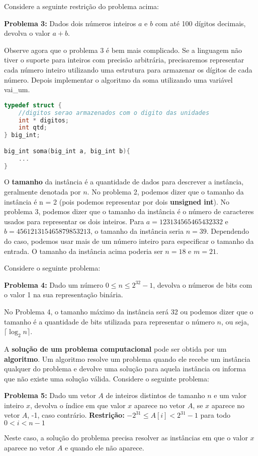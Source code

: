 Considere a seguinte restrição do problema acima:

\textbf{Problema 3:} Dados dois números inteiros $a$ e $b$ com até 100 dígitos decimais, devolva o valor $a + b$. 

Observe agora que o problema 3 é bem mais complicado. Se a linguagem não tiver o suporte para inteiros com precisão arbitrária, precisaremos representar cada número inteiro utilizando uma estrutura para armazenar os dígitos de cada número. Depois implementar o algoritmo da soma utilizando uma variável vai\_um. 

\begin{lstlisting}[language=C, caption={Solução para o problema 3}]
typedef struct {
	//digitos serao armazenados com o digito das unidades
	int * digitos;
	int qtd;
} big_int;

big_int soma(big_int a, big_int b){
	...
}
\end{lstlisting}

O \textbf{tamanho} da instância é a quantidade de dados para descrever a instância, geralmente denotada por $n$. No problema 2, podemos dizer que o tamanho da instância é n = 2 (pois podemos representar por dois \textbf{unsigned int}). No problema 3, podemos dizer que o tamanho da instância é o número de caracteres usados para representar os dois inteiros. Para $a = 123134565465432332$ e $b = 456121315465879853213$, o tamanho da instância seria $n = 39$. Dependendo do caso, podemos usar mais de um número inteiro para especificar o tamanho da entrada. O tamanho da instância acima poderia ser $n = 18$ e $m = 21$. 

Considere o seguinte problema:

\textbf{Problema 4:} Dado um número $ 0 \leq n \leq 2^{32}-1$, devolva o números de bits com o valor 1 na sua representação binária.   

No Problema 4, o tamanho máximo da instância será 32 ou podemos dizer que o tamanho é a quantidade de bits utilizada para representar o número $n$, ou seja, $\lceil \log_2{n} \rceil$.

A \textbf{solução de um problema computacional} pode ser obtida por um \textbf{algoritmo}. Um algoritmo resolve um problema quando ele recebe um instância qualquer do problema e devolve uma solução para aquela instância ou informa que não existe uma solução válida. Considere o seguinte problema:

\textbf{Problema 5:} Dado um vetor $A$ de inteiros distintos de tamanho $n$ e um valor inteiro $x$, devolva o índice em que valor $x$ aparece no vetor $A$, se $x$ aparece no vetor $A$, -1, caso contrário. \textbf{Restrição: }  $-2^{31} \leq A[i] < 2^{31}-1$ para todo $ 0 < i < n-1$   

Neste caso, a solução do problema precisa resolver as instâncias em que o valor $x$ aparece no vetor $A$ e quando ele não aparece.










